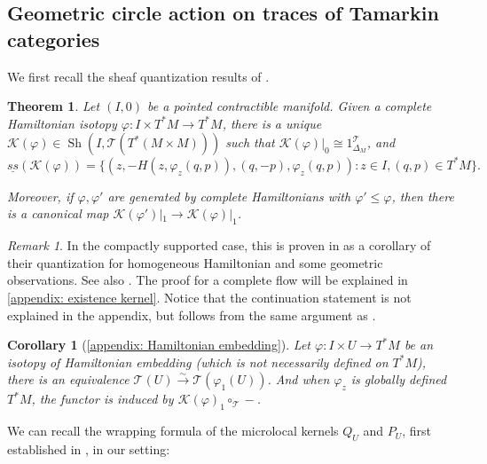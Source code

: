 \documentclass[11pt]{amsart}
\numberwithin{equation}{section}
\theoremstyle{plain}
\newtheorem{Thm}{Theorem}[section]
\newtheorem{Coro}[coro]{Corollary}
\theoremstyle{definition}
\theoremstyle{remark}
\newtheorem{RMK}[rmk]{Remark}
\newcommand{\cK} { {\mathcal{K}}}
\newcommand{\sT} { {\mathscr{T}}}
\newcommand{\Sh} { {\operatorname{Sh}}}
\begin{document}
\subsection{Geometric circle action on traces of Tamarkin categories}\label{sec: geometric circle tamarkin}
We first recall the sheaf quantization results of \cite{GKS2012}.

\begin{Thm}\label{GKS tamarkin version}Let $(I,0)$ be a pointed contractible manifold. Given a complete Hamiltonian isotopy $\varphi: I \times T^*M \to T^*M$, 
    there is a unique $\cK(\varphi) \in \Sh\left(I, \sT\left(T^*(M\times M) \right) \right)$ such that 
    $\cK(\varphi)|_0 \cong 1_{\Delta_{M}}^\sT$, and  
    \begin{equation}\label{equatio: GKS T-linear total graph}
        \underline{ss}(\cK(\varphi)) = \{(z, - H(z,{\varphi}_{z}(q,p))  ,(q,-p),{\varphi}_{z}(q,p) ) : z\in I, (q,p)\in T^*M\}.
    \end{equation}

    Moreover, if $\varphi, \varphi'$ are generated by complete Hamiltonians with $\varphi' \leq  \varphi$, then
    there is a canonical map $\cK(\varphi')|_{1}\rightarrow \cK(\varphi)|_{1}$.
\end{Thm}
\begin{RMK}In the compactly supported case, this is proven in {\cite[Theorem 3.7 \& Proposition 4.8 \& Proposition A.6]{GKS2012}} as a corollary of their quantization for homogeneous Hamiltonian and some geometric observations. See also \cite[Corollary 2.3.2]{guillermou2019sheaves}. The proof for a complete flow will be explained in \autoref{appendix: existence kernel}. Notice that the continuation statement is not explained in the appendix, but follows from the same argument as \cite[Corollary 5.23]{Hochschild-Kuo-Shende-Zhang}.
    
\end{RMK}

\begin{Coro}[{\autoref{appendix: Hamiltonian embedding}}]Let $\varphi: I\times U\to T^*M$ be an isotopy of Hamiltonian embedding (which is not necessarily defined on $T^*M$),  
    there is an equivalence $\sT(U)\xrightarrow{\sim} \sT({\varphi}_1(U))$. And when $\varphi_z$ is globally defined $T^*M$, the functor is induced by $\cK(\varphi)_1\circ_\sT - $.    
\end{Coro}



We can recall the wrapping formula of the microlocal kernels $Q_U$ and $P_U$, first established in \cite[Theorem 1.2]{kuo2021wrapped}, in our setting:
\end{document}
